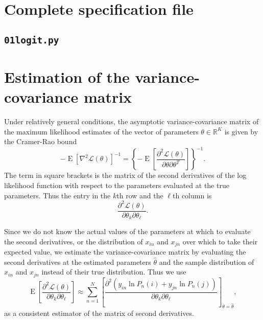 \documentclass[12pt,a4paper]{article}
\newcommand{\R}{\mathbb{R}}
\renewcommand{\L}{\mathcal{L}}
\newcommand{\expect}{\operatorname{E}}
\begin{document}
\clearpage 


\appendix

\section{Complete specification file}

\subsection{\lstinline$01logit.py$}
\label{sec:modelPython}


\clearpage

   \section{Estimation of the  variance-covariance matrix}
   \label{sec:robust}
Under relatively general conditions,  the asymptotic
variance-covariance matrix of the maximum likelihood
estimates of the vector of parameters $\theta \in \R^K$ is given by the Cramer-Rao bound
\begin{equation}
  \label{eq:RaoCramer}
  -\expect\left[ \nabla^2 \L(\theta)\right]^{-1} =  \left\{-\expect\left[\frac{\partial^2 \L(\theta)}{\partial \theta \partial \theta^T}\right]\right\}^{-1}.
\end{equation}
The term in square brackets is the matrix of the second derivatives
of the log likelihood function with respect to the parameters
evaluated at the true parameters.  Thus the entry in the $k$\/th row and
the $\ell$\/th column is
\begin{equation}
  \label{eq:BAL4.34}
 \frac{\partial^2 \L(\theta)}{\partial \theta_k \partial \theta_{\ell}}.
\end{equation}

Since we do not know the actual values of the parameters at which to
evaluate the second derivatives, or the distribution of $x_{in}$ and
$x_{jn}$ over which to take their expected value, we estimate the
variance-covariance matrix by evaluating the second derivatives  at the estimated parameters
$\hat{\theta}$ and the sample distribution of $x_{in}$ and $x_{jn}$ instead of
 their true distribution. Thus we use
\begin{equation}
  \label{eq:BAL4.35}
  \expect\left[\frac{\partial^2 \L(\theta)}{\partial \theta_k \partial \theta_\ell}  \right]\approx \sum_{n=1}^N \left[\frac{\partial^2\left(y_{in}\ln P_n(i) + y_{jn} \ln P_n(j) \right)}{\partial \theta_k \partial \theta_\ell} \right]_{\theta=\hat{\theta}},
\end{equation}
as a consistent estimator of the matrix of second derivatives. 
\end{document}
